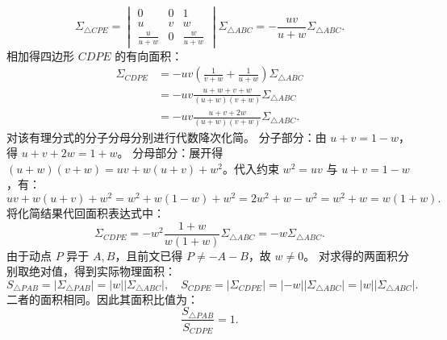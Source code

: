 \begin{solution}
\[\]
\[
\Sigma_{\triangle CPE} = \begin{vmatrix} 0 & 0 & 1 \\ u & v & w \\ \frac{u}{u+w} & 0 & \frac{w}{u+w} \end{vmatrix} \Sigma_{\triangle ABC} = -\frac{uv}{u+w} \Sigma_{\triangle ABC}.
\]
相加得四边形 $CDPE$ 的有向面积：
\[
\begin{aligned}
\Sigma_{CDPE}
&= -uv \left( \frac{1}{v+w} + \frac{1}{u+w} \right) \Sigma_{\triangle ABC} \\
&= -uv \frac{u+w+v+w}{(u+w)(v+w)} \Sigma_{\triangle ABC} \\
&= -uv \frac{u+v+2w}{(u+w)(v+w)} \Sigma_{\triangle ABC}.
\end{aligned}
\]
对该有理分式的分子分母分别进行代数降次化简。
分子部分：由 $u+v = 1-w$，得 $u+v+2w = 1+w$。
分母部分：展开得 $(u+w)(v+w) = uv + w(u+v) + w^2$。代入约束 $w^2 = uv$ 与 $u+v = 1-w$，有：
\[
uv + w(u+v) + w^2 = w^2 + w(1-w) + w^2 = 2w^2 + w - w^2 = w^2 + w = w(1+w).
\]
将化简结果代回面积表达式中：
\[
\Sigma_{CDPE} = -w^2 \frac{1+w}{w(1+w)} \Sigma_{\triangle ABC} = -w \Sigma_{\triangle ABC}.
\]
由于动点 $P$ 异于 $A, B$，且前文已得 $P \neq -A-B$，故 $w \neq 0$。
对求得的两面积分别取绝对值，得到实际物理面积：
\[
S_{\triangle PAB} = |\Sigma_{\triangle PAB}| = |w| |\Sigma_{\triangle ABC}|, \quad S_{CDPE} = |\Sigma_{CDPE}| = |-w| |\Sigma_{\triangle ABC}| = |w| |\Sigma_{\triangle ABC}|.
\]
二者的面积相同。因此其面积比值为：
\[
\frac{S_{\triangle PAB}}{S_{CDPE}} = 1.
\]

\end{solution}


